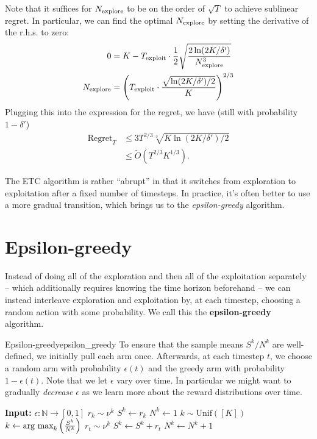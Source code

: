 \documentclass[\main/main]{subfiles}
\begin{document}
Note that it suffices for $N_{\text{explore}}$ to be on the order of $\sqrt{T}$ to achieve sublinear regret. In particular, we can find the optimal $N_{\text{explore}}$ by setting the derivative of the r.h.s. to zero:
\begin{align*}
    0    & = K - T_{\text{exploit}} \cdot \frac{1}{2} \sqrt{\frac{2\ln(2K/\delta')}{N_{\text{explore}}^3}}  \\
    N_{\text{explore}} & = \left( T_{\text{exploit}} \cdot \frac{\sqrt{\ln(2K/\delta')/2}}{K} \right)^{2/3}
\end{align*}
Plugging this into the expression for the regret, we have (still with probability $1-\delta'$)
\begin{align*}
    \text{Regret}_T & \le 3 T^{2/3} \sqrt[3]{K \ln(2K/\delta') / 2} \\
                    & \le \tilde{O}(T^{2/3} K^{1/3}).
\end{align*}

The ETC algorithm is rather ``abrupt'' in that it switches from exploration to exploitation after a fixed number of timesteps. In practice, it's often better to use a more gradual transition, which brings us to the \emph{epsilon-greedy} algorithm.

\section{Epsilon-greedy}

Instead of doing all of the exploration and then all of the exploitation separately -- which additionally requires knowing the time horizon beforehand -- we can instead interleave exploration and exploitation by, at each timestep, choosing a random action with some probability. We call this the \textbf{epsilon-greedy} algorithm.

\begin{definition}{Epsilon-greedy}{epsilon_greedy}
    To ensure that the sample means $S^k/N^k$ are well-defined, we initially pull each arm once. Afterwards, at each timestep $t$, we choose a random arm with probability $\epsilon(t)$ and the greedy arm with probability $1-\epsilon(t)$.
    Note that we let $\epsilon$ vary over time. In particular we might want to gradually \emph{decrease} $\epsilon$ as we learn more about the reward distributions over time.

    \begin{algorithmic}
        \State \textbf{Input:} $\epsilon : \mathbb{N} \to [0, 1]$
        \State $r_k \sim \nu^k$
        \State $S^k \gets r_k$
        \State $N^k \gets 1$
        \EndFor
        \State $k \sim \text{Unif}([K])$
        \Else
        \State $k \gets \operatorname*{\textrm{arg\ max}}_k \left(\frac{S^k}{N^k}\right)$
        \EndIf
        \State $r_t \sim \nu^k$
        \State $S^k \gets S^k + r_t$
        \State $N^k \gets N^k + 1$
        \EndFor
    \end{algorithmic}
\end{definition}
\end{document}
